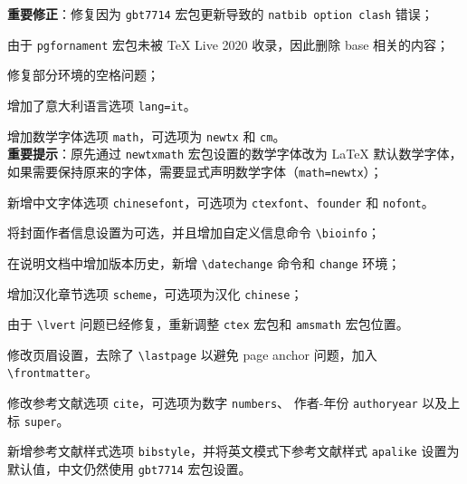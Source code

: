 \documentclass[cn,10pt,math=newtx,citestyle=gb7714-2015,bibstyle=gb7714-2015]{elegantbook}
\begin{document}

\begin{change}
  \item \textbf{重要修正}：修复因为 \lstinline{gbt7714} 宏包更新导致的 \lstinline{natbib option clash} 错误；
  \item 由于 \lstinline{pgfornament} 宏包未被 \TeX{} Live 2020 收录，因此删除 base 相关的内容；
  \item 修复部分环境的空格问题；
  \item 增加了意大利语言选项 \lstinline{lang=it}。
\end{change}



\begin{change}
  \item 增加数学字体选项 \lstinline{math}，可选项为 \lstinline{newtx} 和 \lstinline{cm}。\\
  \textbf{重要提示}：原先通过 \lstinline{newtxmath} 宏包设置的数学字体改为 \LaTeX{} 默认数学字体，如果需要保持原来的字体，需要显式声明数学字体（\lstinline{math=newtx}）；
  \item 新增中文字体选项 \lstinline{chinesefont}，可选项为 \lstinline{ctexfont}、\lstinline{founder} 和 \lstinline{nofont}。
  \item 将封面作者信息设置为可选，并且增加自定义信息命令 \lstinline{\bioinfo}；
  \item 在说明文档中增加版本历史，新增 \lstinline{\datechange} 命令和 \lstinline{change} 环境；
  \item 增加汉化章节选项 \lstinline{scheme}，可选项为汉化 \lstinline{chinese}；
  \item 由于 \lstinline{\lvert} 问题已经修复，重新调整 \lstinline{ctex} 宏包和 \lstinline{amsmath} 宏包位置。
  \item 修改页眉设置，去除了 \lstinline{\lastpage} 以避免 page anchor 问题，加入 \lstinline{\frontmatter}。
  \item 修改参考文献选项 \lstinline{cite}，可选项为数字 \lstinline{numbers}、 作者-年份 \lstinline{authoryear} 以及上标 \lstinline{super}。
  \item 新增参考文献样式选项 \lstinline{bibstyle}，并将英文模式下参考文献样式 \lstinline{apalike} 设置为默认值，中文仍然使用 \lstinline{gbt7714} 宏包设置。
\end{change}

\end{document}
